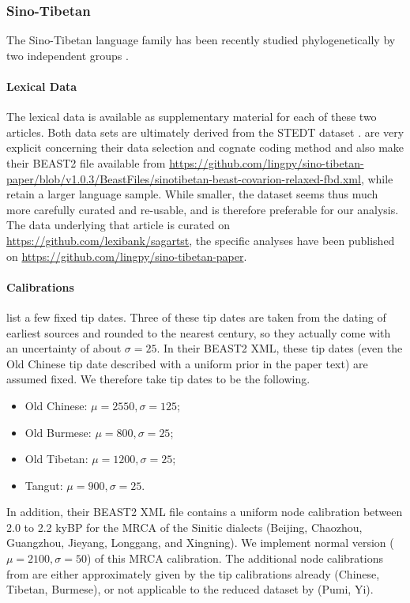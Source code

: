 \documentclass[a4paper,12pt]{scrartcl}
\begin{document}
\subsubsection{Sino-Tibetan}
The Sino-Tibetan language family has been recently studied phylogenetically by two independent groups
\parencite{sagart2019dated,zhang2019phylogenetic}.
\paragraph{Lexical Data}
The lexical data is available as supplementary material for each of these two
articles. Both data sets are ultimately derived from the STEDT dataset
\parencite{stedt}.  are very explicit concerning their
data selection and cognate coding method and also make their BEAST2 file available from \url{https://github.com/lingpy/sino-tibetan-paper/blob/v1.0.3/BeastFiles/sinotibetan-beast-covarion-relaxed-fbd.xml}, while
 retain a larger language sample.
While smaller, the \textcite{sagart2019dated} dataset seems thus much more carefully
curated and re-usable, and is therefore preferable for our analysis.
The data underlying that article is curated on \url{https://github.com/lexibank/sagartst}, the specific analyses have been published on \url{https://github.com/lingpy/sino-tibetan-paper}.

\paragraph{Calibrations}
\Textcite{sagart2019dated} list a few fixed tip dates. Three of these tip dates are taken from the dating of earliest sources and rounded to the nearest century, so they actually come with an uncertainty of about $\sigma=25$. In their BEAST2 XML, these tip dates (even the Old Chinese tip date described with a uniform prior in the paper text) are assumed fixed.
We therefore take tip dates to be the following.
\begin{itemize}
    \item Old Chinese: $\mu=2550, \sigma=125$;
    \item Old Burmese: $\mu=800, \sigma=25$;
    \item Old Tibetan: $\mu=1200, \sigma=25$;
    \item Tangut: $\mu=900, \sigma=25$.
\end{itemize}
In addition, their BEAST2 XML file contains a uniform node calibration between 2.0 to 2.2 kyBP for the MRCA of the Sinitic dialects (Beijing, Chaozhou, Guangzhou, Jieyang, Longgang, and Xingning). We implement normal version ($\mu=2100, \sigma=50$) of this MRCA calibration.
The additional node calibrations from \textcite{zhang2019phylogenetic} are either approximately given by the tip calibrations already (Chinese, Tibetan, Burmese), or not applicable to the reduced dataset by \textcite{sagart2019dated} (Pumi, Yi).
\end{document}
